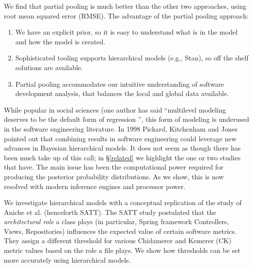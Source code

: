 \documentclass[sigconf,natbib=false]{acmart}
\begin{document}
We find that partial pooling is much better than the other two approaches, using root mean squared error (RMSE). The advantage of the partial pooling approach: 
\begin{enumerate}
	\item We have an explicit prior, so it is easy to understand what is in the model and how the model is created. 
	\item Sophisticated tooling supports hierarchical models (e.g., Stan), so off the shelf solutions are available.
	\item Partial pooling accommodates our intuitive understanding of software development analysis, that balances the local and global data available.
\end{enumerate}

While popular in social sciences (one author has said ``multilevel modeling deserves to be the default form of regression \cite[p.14]{mcilreath16}'', this form of modeling is underused in the software engineering literature. In 1998 Pickard, Kitchenham and Jones \cite{PICKARD1998811} pointed out that combining results in software engineering could leverage new advances in Bayesian hierarchical models. It does not seem as though there has been much take up of this call; in \S \ref{related} we highlight the one or two studies that have. The main issue has been the computational power required for producing the posterior probability distributions. As we show, this is now resolved with modern inference engines and processor power. %

We investigate hierarchical models with a conceptual replication of the study of Aniche et al. \cite{Aniche2016} (henceforth SATT). The SATT study postulated that the \emph{architectural role} a class plays (in particular, Spring framework Controllers, Views, Repositories) influences the expected value of certain software metrics. They assign a different threshold for various Chidamerer and Kemerer (CK) metric values \cite{Chidamber_1991} based on the role a file plays. We show how thresholds can be set more accurately using hierarchical models.

\end{document}
